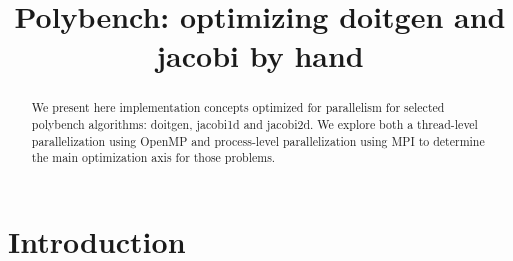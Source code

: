 \documentclass[letterpaper]{article}
\title{Polybench: optimizing doitgen and jacobi by hand}
\newcommand{\mypar}[1]{{\bf #1.}}
\begin{document}
%
\maketitle
%


\begin{abstract}
We present here implementation concepts optimized for parallelism for selected polybench algorithms: doitgen, jacobi1d and jacobi2d.
We explore both a thread-level parallelization using OpenMP and process-level parallelization using MPI to determine the main optimization axis for those problems.
\end{abstract}

\section{Introduction}\label{sec:intro}




\end{document}
